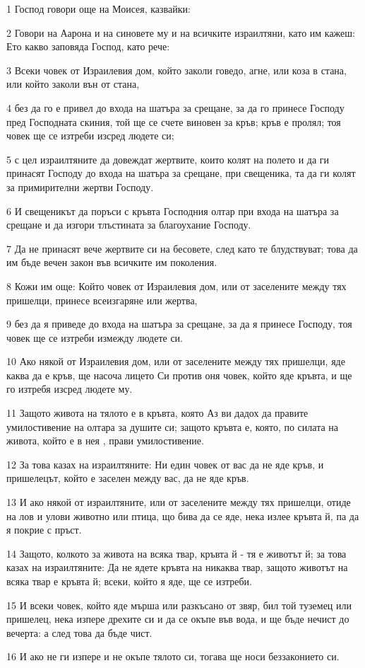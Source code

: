 \par 1 Господ говори още на Моисея, казвайки:
\par 2 Говори на Аарона и на синовете му и на всичките израилтяни, като им кажеш: Ето какво заповяда Господ, като рече:
\par 3 Всеки човек от Израилевия дом, който заколи говедо, агне, или коза в стана, или който заколи вън от стана,
\par 4 без да го е привел до входа на шатъра за срещане, за да го принесе Господу пред Господната скиния, той ще се счете виновен за кръв; кръв е пролял; тоя човек ще се изтреби изсред людете си;
\par 5 с цел израилтяните да довеждат жертвите, които колят на полето и да ги принасят Господу до входа на шатъра за срещане, при свещеника, та да ги колят за примирителни жертви Господу.
\par 6 И свещеникът да поръси с кръвта Господния олтар при входа на шатъра за срещане и да изгори тлъстината за благоухание Господу.
\par 7 Да не принасят вече жертвите си на бесовете, след като те блудствуват; това да им бъде вечен закон във всичките им поколения.
\par 8 Кожи им още: Който човек от Израилевия дом, или от заселените между тях пришелци, принесе всеизгаряне или жертва,
\par 9 без да я приведе до входа на шатъра за срещане, за да я принесе Господу, тоя човек ще се изтреби измежду людете си.
\par 10 Ако някой от Израилевия дом, или от заселените между тях пришелци, яде каква да е кръв, ще насоча лицето Си против оня човек, който яде кръвта, и ще го изтребя изсред людете му.
\par 11 Защото живота на тялото е в кръвта, която Аз ви дадох да правите умилостивение на олтара за душите си; защото кръвта е, която, по силата на живота, който е в нея , прави умилостивение.
\par 12 За това казах на израилтяните: Ни един човек от вас да не яде кръв, и пришелецът, който е заселен между вас, да не яде кръв.
\par 13 И ако някой от израилтяните, или от заселените между тях пришелци, отиде на лов и улови животно или птица, що бива да се яде, нека излее кръвта й, па да я покрие с пръст.
\par 14 Защото, колкото за живота на всяка твар, кръвта й - тя е животът й; за това казах на израилтяните: Да не ядете кръвта на никаква твар, защото животът на всяка твар е кръвта й; всеки, който я яде, ще се изтреби.
\par 15 И всеки човек, който яде мърша или разкъсано от звяр, бил той туземец или пришелец, нека изпере дрехите си и да се окъпе във вода, и ще бъде нечист до вечерта: а след това да бъде чист.
\par 16 И ако не ги изпере и не окъпе тялото си, тогава ще носи беззаконието си.

